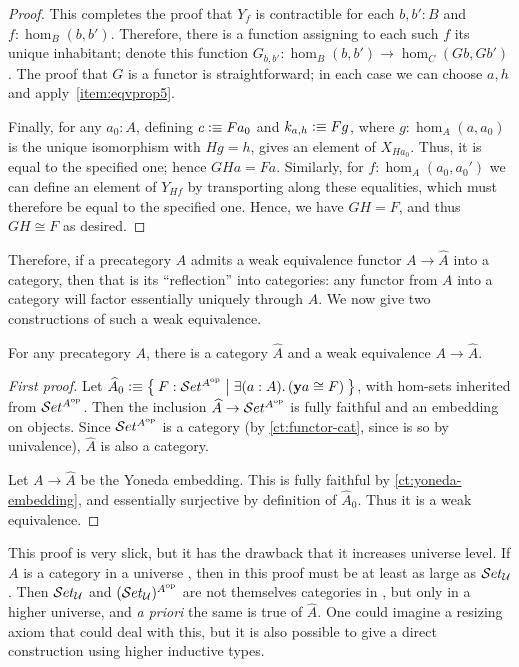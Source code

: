 \begin{proof}
  This completes the proof that $Y_f$ is contractible for each $b,b':B$ and $f:\hom_B(b,b')$.
  Therefore, there is a function assigning to each such $f$ its unique inhabitant; denote this function $G_{b,b'}:\hom_B(b,b') \to \hom_C(Gb,Gb')$.
  The proof that $G$ is a functor is straightforward; in each case we can choose $a,h$ and apply~\ref{item:eqvprop5}.

  Finally, for any $a_0:A$, defining $c\vcentcolon\equiv Fa_0$ and $k_{a,h}\vcentcolon\equiv F g$, where $g:\hom_A(a,a_0)$ is the unique isomorphism with $Hg = h$, gives an element of $X_{Ha_0}$.
  Thus, it is equal to the specified one; hence $GHa=Fa$.
  Similarly, for $f:\hom_A(a_0,a_0')$ we can define an element of $Y_{Hf}$ by transporting along these equalities, which must therefore be equal to the specified one.
  Hence, we have $GH=F$, and thus $GH\cong F$ as desired.
\end{proof}

%
Therefore, if a precategory $A$ admits a weak equivalence functor $A\to \widehat{A}$ into a category, then that is its ``reflection'' into categories: any functor from $A$ into a category will factor essentially uniquely through $\widehat{A}$.
We now give two constructions of such a weak equivalence.

%
%

\begin{thm}\label{thm:rezk-completion}
  For any precategory $A$, there is a category $\widehat A$ and a weak equivalence $A\to\widehat{A}$.
\end{thm}

\begin{proof}[First proof]
  Let $\widehat{A}_0 \defeq \setof{ F:\uset^{A\op} | \exis{a:A} (\y a \cong F)}$, with hom-sets inherited from $\mathcal{S}et^{A^{\mathrm{op}}}$.
  Then the inclusion $\widehat{A} \to \mathcal{S}et^{A^{\mathrm{op}}}$ is fully faithful and an embedding on objects.
  Since $\mathcal{S}et^{A^{\mathrm{op}}}$ is a category (by \cref{ct:functor-cat}, since \uset is so by univalence), $\widehat A$ is also a category.

  Let $A\to\widehat A$ be the Yoneda embedding.
  This is fully faithful by \cref{ct:yoneda-embedding}, and essentially surjective by definition of $\widehat{A}_0$.
  Thus it is a weak equivalence.
\end{proof}

This proof is very slick, but it has the drawback that it increases universe level.
If $A$ is a category in a universe \bbU, then in this proof \uset must be at least as large as $\mathcal{S}et_\mathcal{U}$.
Then $\mathcal{S}et_\mathcal{U}$ and $(\mathcal{S}et_\mathcal{U})^{A^{\mathrm{op}}}$ are not themselves categories in \bbU, but only in a higher universe, and \emph{a priori} the same is true of $\widehat A$.
One could imagine a resizing axiom that could deal with this, but it is also possible to give a direct construction using higher inductive types.

